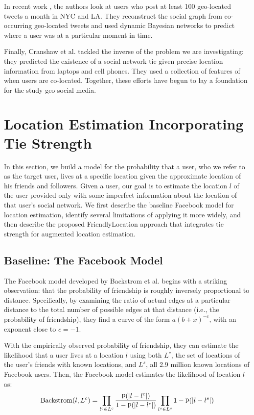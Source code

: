 \documentclass[letterpaper]{article}
\DeclareMathOperator{\Backstrom}{Backstrom}
\DeclareMathOperator{\p}{p}
\begin{document}

In recent work \cite{sadilek2012finding}, the authors look at users who post at least 100 geo-located tweets a month in NYC and LA. They reconstruct the social graph from co-occurring geo-located tweets and used dynamic Bayesian networks to predict where a user was at a particular moment in time.

Finally, Cranshaw et al. \cite{cranshaw2010bridging} tackled the inverse of the problem we are investigating: they predicted the existence of a social network tie given precise location information from laptops and cell phones. They used a collection of features of when users are co-located.  Together, these efforts have begun to lay a foundation for the study geo-social media.

\section{Location Estimation Incorporating Tie Strength}
In this section, we build a model for the probability that a user, who we refer to as the target user, lives at a specific location given the approximate location of his friends and followers.
%
Given a user, our goal is to estimate the location $l$ of the user provided only with some imperfect information about the location of that user's social network.
%
We first describe the baseline Facebook model for location estimation, identify several limitations of applying it more widely, and then describe the proposed FriendlyLocation approach that integrates tie strength for augmented location estimation.

\subsection{Baseline: The Facebook Model}
The Facebook model developed by Backstrom et al. \cite{backstrom2010find} begins with a striking observation: that the probability of friendship is roughly inversely proportional to distance. Specifically, by examining the ratio of actual edges at a particular distance to the total number of possible edges at that distance (i.e., the probability of friendship), they find a curve of the form $a(b+x)^{-c}$, with an exponent close to $c=-1$.

With the empirically observed probability of friendship, they can estimate the
likelihood that a user lives at a location $l$ using both $L^c$, the set of
locations of the user's friends with known locations, and $L^s$, all 2.9
million known locations of Facebook users.
%
Then, the Facebook model estimates the likelihood of location $l$ as:
\[
    \Backstrom(l,L^c) =
        \prod_{l^c \in L^c} {\p(|l-l^c|) \over 1-\p(|l-l^c|) }
        \prod_{l^s \in L^s} 1-\p(|l-l^s|)
\]
\end{document}
